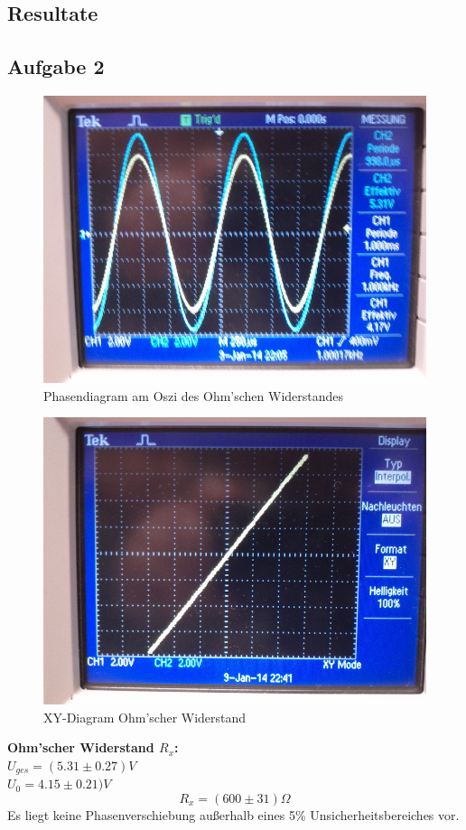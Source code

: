 \documentclass[12pt,a4paper]{article}
\begin{document}
\begin{multicols}{2}
\section{Resultate}

\subsection{Aufgabe 2}
\begin{figure}[H]
	\centering
	\includegraphics[scale=0.25]{./figure/1kHz_Oszi_RX.jpg}
	\caption{Phasendiagram am Oszi des Ohm'schen Widerstandes}
	\label{fig:phase_rx}
\end{figure}
\begin{figure}[H]
	\centering
	\includegraphics[scale=0.25]{./figure/xy_ohm.jpg}
	\caption{XY-Diagram Ohm'scher Widerstand}
	\label{fig:xy_rx}
\end{figure}
\textbf{Ohm'scher Widerstand $R_x$:}\\
$U_{ges} = (5.31 \pm 0.27)V$\\
$U_0 = 4.15 \pm 0.21)V$\\
$$R_x=(600 \pm 31)\Omega$$
Es liegt keine Phasenverschiebung außerhalb eines 5\% Unsicherheitsbereiches vor.


\end{multicols}
\end{document}
